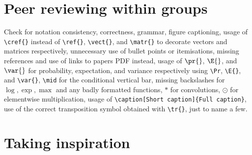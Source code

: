 \section*{Peer reviewing within groups}

Check for notation consistency, correctness, grammar, figure captioning, usage of \verb|\cref{}| instead of \verb|\ref{}|, \verb|\vect{}|, and \verb|\matr{}| to decorate vectors and matrices respectively, unnecessary use of bullet points or itemisations, missing references and use of links to papers PDF instead, usage of  $\pr{}$, $\E{}$, and $\var{}$ for probability, expectation, and variance respectively using \verb|\Pr|, \verb|\E{}|, and \verb|\var{}|, \verb|\mid| for the conditional vertical bar, missing backslashes for $\log, \exp, \max$ and any badly formatted functions, $\ast$ for convolutions, $\odot$ for elementwise multiplication, usage of \verb|\caption[Short caption]{Full caption}|, use of the correct transposition symbol obtained with \verb|\tr{}|, just to name a few.

\section*{Taking inspiration}

